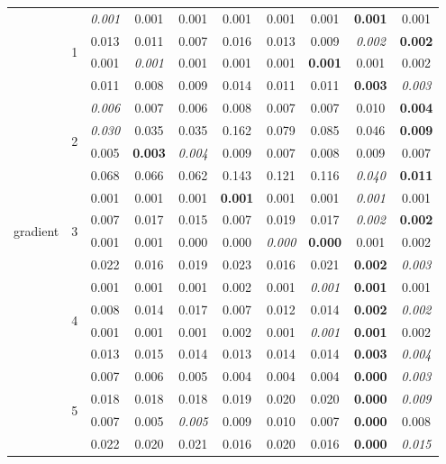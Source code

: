 \documentclass[authoryear, review, 11pt]{elsarticle}
\begin{document}
\begin{table}
\begin{center}
{\begin{tabular}{cccccccccc}
  \multirow{20}{*}{gradient} & \multirow{4}{*}{1} & \emph{0.001} & 0.001 & 0.001 & 0.001 & 0.001 & 0.001 & \textbf{0.001} & 0.001 \\ 
  &  & 0.013 & 0.011 & 0.007 & 0.016 & 0.013 & 0.009 & \emph{0.002} & \textbf{0.002} \\ 
  &  & 0.001 & \emph{0.001} & 0.001 & 0.001 & 0.001 & \textbf{0.001} & 0.001 & 0.002 \\ 
  &  & 0.011 & 0.008 & 0.009 & 0.014 & 0.011 & 0.011 & \textbf{0.003} & \emph{0.003} \\ 
  \cline{3-10}  
  & \multirow{4}{*}{2} & \emph{0.006} & 0.007 & 0.006 & 0.008 & 0.007 & 0.007 & 0.010 & \textbf{0.004} \\ 
  &  & \emph{0.030} & 0.035 & 0.035 & 0.162 & 0.079 & 0.085 & 0.046 & \textbf{0.009} \\ 
  &  & 0.005 & \textbf{0.003} & \emph{0.004} & 0.009 & 0.007 & 0.008 & 0.009 & 0.007 \\ 
  &  & 0.068 & 0.066 & 0.062 & 0.143 & 0.121 & 0.116 & \emph{0.040} & \textbf{0.011} \\ 
  \cline{3-10}
  & \multirow{4}{*}{3} & 0.001 & 0.001 & 0.001 & \textbf{0.001} & 0.001 & 0.001 & \emph{0.001} & 0.001 \\ 
  &  & 0.007 & 0.017 & 0.015 & 0.007 & 0.019 & 0.017 & \emph{0.002} & \textbf{0.002} \\ 
  &  & 0.001 & 0.001 & 0.000 & 0.000 & \emph{0.000} & \textbf{0.000} & 0.001 & 0.002 \\ 
  &  & 0.022 & 0.016 & 0.019 & 0.023 & 0.016 & 0.021 & \textbf{0.002} & \emph{0.003} \\ 
  \cline{3-10}
  & \multirow{4}{*}{4} & 0.001 & 0.001 & 0.001 & 0.002 & 0.001 & \emph{0.001} & \textbf{0.001} & 0.001 \\ 
  &  & 0.008 & 0.014 & 0.017 & 0.007 & 0.012 & 0.014 & \textbf{0.002} & \emph{0.002} \\ 
  &  & 0.001 & 0.001 & 0.001 & 0.002 & 0.001 & \emph{0.001} & \textbf{0.001} & 0.002 \\ 
  &  & 0.013 & 0.015 & 0.014 & 0.013 & 0.014 & 0.014 & \textbf{0.003} & \emph{0.004} \\ 
  \cline{3-10}
  & \multirow{4}{*}{5} & 0.007 & 0.006 & 0.005 & 0.004 & 0.004 & 0.004 & \textbf{0.000} & \emph{0.003} \\ 
  &  & 0.018 & 0.018 & 0.018 & 0.019 & 0.020 & 0.020 & \textbf{0.000} & \emph{0.009} \\ 
  &  & 0.007 & 0.005 & \emph{0.005} & 0.009 & 0.010 & 0.007 & \textbf{0.000} & 0.008 \\ 
  &  & 0.022 & 0.020 & 0.021 & 0.016 & 0.020 & 0.016 & \textbf{0.000} & \emph{0.015} \\ 
  \hline
  

\end{tabular}}
\end{center}
\end{table}
\end{document}
